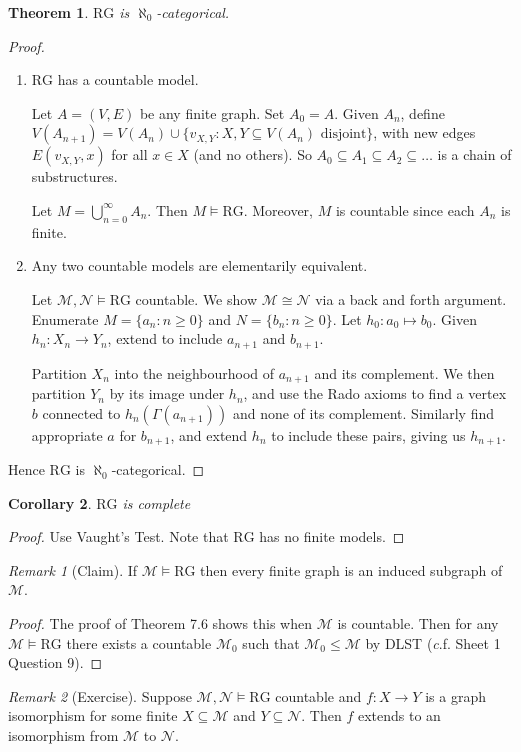 \documentclass[]{article}
\theoremstyle{custhm}
\newtheorem{theorem}{Theorem}[section]
\theoremstyle{cusdef}
\theoremstyle{custhm}
\theoremstyle{custhm}
\newtheorem{cor}[theorem]{Corollary}
\theoremstyle{custhm}
\theoremstyle{ex}
\theoremstyle{custhm}
\theoremstyle{cusdef}
\theoremstyle{remark}
\newtheorem*{remark*}{Remark}
\theoremstyle{remark}
\newcommand{\ra}{\rightarrow}
\renewcommand{\it}[1]{\textit{#1}}
\newcommand{\M}{\mathcal{M}}
\newcommand{\N}{\mathcal{N}}
\newcommand{\rg}{\textrm{RG}}
\renewcommand{\subset}{\subseteq}
\begin{document}
\begin{theorem}
$\rg$ is $\aleph_0$-categorical.
\end{theorem}
\begin{proof}\ 
\begin{enumerate}[label=\arabic*)]
	\item $\rg$ has a countable model.
	
	Let $A = (V,E)$ be any finite graph. Set $A_0 = A$. Given $A_n$, define $V(A_{n+1}) = V(A_n)\cup\{v_{X,Y}:X,Y\subset V(A_n)\textrm{ disjoint}\}$, with new edges $E(v_{X,Y},x)$ for all $x\in X$ (and no others). So $A_0\subset A_1\subset A_2\subset\dots$ is a chain of substructures.
	
	Let $M = \bigcup_{n=0}^{\infty}A_n$. Then $M\models\rg$. Moreover, $M$ is countable since each $A_n$ is finite. 
	
	\item Any two countable models are elementarily equivalent.
	
	Let $\M,\N\models \rg$ countable. We show $\M\cong \N$ via a back and forth argument. Enumerate $M = \{a_n : n\ge 0\}$ and $N = \{b_n:n\ge 0\}$. Let $h_0: a_0\mapsto b_0$. Given $h_n:X_n\ra Y_n$, extend to include $a_{n+1}$ and $b_{n+1}$.
	
	Partition $X_n$ into the neighbourhood of $a_{n+1}$ and its complement. We then partition $Y_n$ by its image under $h_n$, and use the Rado axioms to find a vertex $b$ connected to $h_n(\Gamma(a_{n+1}))$ and none of its complement. Similarly find appropriate $a$ for $b_{n+1}$, and extend $h_n$ to include these pairs, giving us $h_{n+1}$.
\end{enumerate}
Hence $\rg$ is $\aleph_0$-categorical.
\end{proof}
\begin{cor}
$\rg$ is complete
\end{cor}
\begin{proof}
Use Vaught's Test. Note that $\rg$ has no finite models.
\end{proof}
\begin{remark*}[Claim]
If $\M\models \rg$ then every finite graph is an induced subgraph of $\M$.
\end{remark*}
\begin{proof}
The proof of Theorem 7.6 shows this when $\M$ is countable. Then for any $\M\models \rg$ there exists a countable $\M_0$ such that $\M_0\le \M$ by DLST ({\it c.f.} Sheet 1 Question 9).
\end{proof}
\begin{remark*}[Exercise]
	Suppose $\M,\N\models\rg$ countable and $f: X\ra Y$ is a graph isomorphism for some finite $X\subset \M$ and $Y\subset \N$. Then $f$ extends to an isomorphism from $\M$ to $\N$.
\end{remark*}
\end{document}
